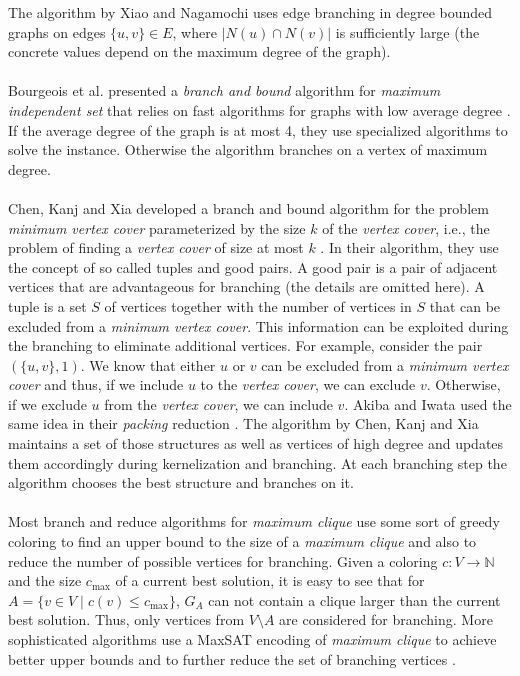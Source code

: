 \documentclass[]{article}
\begin{document}
The algorithm by Xiao and Nagamochi uses edge branching in degree bounded graphs on edges $\{u,v\}\in E$, where $|N(u)\cap N(v)|$ is sufficiently large (the concrete values depend on the maximum degree of the graph). \\\\
Bourgeois et al. presented a \textit{branch and bound} algorithm for \textit{maximum independent set} that relies on fast algorithms for graphs with low average degree \cite{Bourgeois}. If the average degree of the graph is at most 4, they use specialized algorithms to solve the instance. Otherwise the algorithm branches on a vertex of maximum degree.\\\\
Chen, Kanj and Xia developed a branch and bound algorithm for the problem \textit{minimum vertex cover} parameterized by the size $k$ of the \textit{vertex cover}, i.e., the problem of finding a \textit{vertex cover} of size at most $k$ \cite{ChenXiaKanj}. In their algorithm, they use the concept of so called tuples and good pairs. A good pair is a pair of adjacent vertices that are advantageous for branching (the details are omitted here). A tuple is a set $S$ of vertices together with the number of vertices in $S$ that can be excluded from a \textit{minimum vertex cover}. This information can be exploited during the branching to eliminate additional vertices. For example, consider the pair $(\{u,v\}, 1)$. We know that either $u$ or $v$ can be excluded from a \textit{minimum vertex cover} and thus, if we include $u$ to the \textit{vertex cover}, we can exclude $v$. Otherwise, if we exclude $u$ from the \textit{vertex cover}, we can include $v$. Akiba and Iwata used the same idea in their \textit{packing} reduction \cite{AkibaIwata}. The algorithm by Chen, Kanj and Xia maintains a set of those structures as well as vertices of high degree and updates them accordingly during kernelization and branching. At each branching step the algorithm chooses the best structure and branches on it.\\\\
Most branch and reduce algorithms for \textit{maximum clique} use some sort of greedy coloring to find an upper bound to the size of a \textit{maximum clique} and also to reduce the number of possible vertices for branching. Given a coloring $c:V \rightarrow \mathbb{N}$ and the size $c_\text{max}$ of a current best solution, it is easy to see that for $A = \{v\in V \;|\; c(v)\leq c_\text{max}\}$, $G_A$ can not contain a clique larger than the current best solution. Thus, only vertices from $V\setminus A$ are considered for branching. More sophisticated algorithms use a MaxSAT encoding of \textit{maximum clique} to achieve better upper bounds and to further reduce the set of branching vertices \cite{LiJiang,LiFangXu}. \\\\
\end{document}
